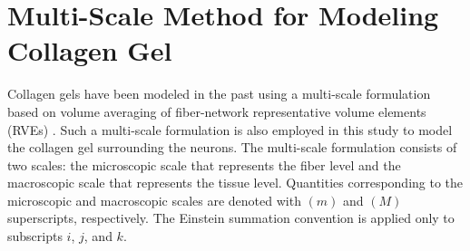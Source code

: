 \documentclass[]{interact}
\begin{document}
\section{Multi-Scale Method for Modeling Collagen Gel}
\label{sec:multiscale_method}
Collagen gels have been modeled in the past using a multi-scale formulation based on volume averaging of fiber-network representative volume elements (RVEs) \citep{Chandran:2007hy,Stylianopoulos:2007dp,Barocas:2007gk,Lai:2012ji,Lake:2012jm}. Such a multi-scale formulation is also employed in this study to model the collagen gel surrounding the neurons. The multi-scale formulation consists of two scales: the microscopic scale that represents the fiber level and the macroscopic scale that represents the tissue level. Quantities corresponding to the microscopic and macroscopic scales are denoted with $(m)$ and $(M)$ superscripts, respectively. The Einstein summation convention is applied only to subscripts $i$, $j$, and $k$.
\end{document}
